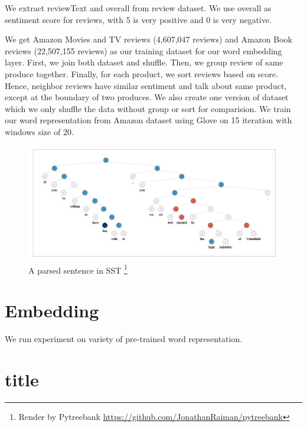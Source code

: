 We extract reviewText and overall from review dataset. We use overall as sentiment score for reviews, with 5 is very positive and 0 is very negative.



We get Amazon Movies and TV reviews (4,607,047 reviews) and Amazon Book reviews (22,507,155 reviews) \cite{he2016ups} as our training dataset for our word embedding layer. First, we join both dataset and shuffle. Then, we group review of same produce together. Finally, for each product, we sort reviews based on score. Hence, neighbor reviews have similar sentiment and talk about same product, except at the boundary of two produces. We also create one version of dataset which we only shuffle the data without group or sort for comparision. We train our word representation from Amazon dataset using Glove \cite{pennington2014glove} on 15 iteration with windows size of 20.


\begin{figure}[H]
	\begin{minipage}{\textwidth}
		\centering
		\includegraphics[width=0.9\linewidth]{figure/sst}
		\caption[A parsed sentence in SST]{A parsed sentence in SST \footnote{Render by Pytreebank \url{https://github.com/JonathanRaiman/pytreebank}}}
		\label{fig:sst}
	\end{minipage}
\end{figure}



\section{Embedding}
We run experiment on variety of pre-trained word representation.

\section{title}

